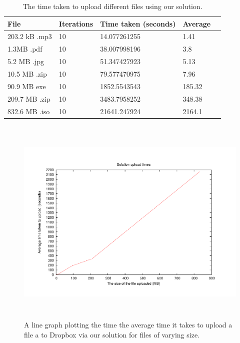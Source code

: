 \documentclass[12pt, titlepage]{article}
\begin{document}
\bigskip
\begin{table}[H]
\begin{center}
    \begin{tabular}{ | l | l | l | l | l |}
    \hline
    \textbf{File} & \textbf{Iterations} & \textbf{Time taken (seconds)} & \textbf{Average} \\ \hline
    203.2 kB .mp3 & 10 & 14.077261255 & 1.41 \\ \hline
    1.3MB .pdf & 10 & 38.007998196 & 3.8 \\ \hline 
    5.2 MB .jpg & 10 & 51.347427923 & 5.13 \\ \hline
    10.5 MB .zip & 10 & 79.577470975 & 7.96  \\ \hline
    90.9 MB exe & 10 & 1852.5543543 & 185.32 \\ \hline
    209.7 MB .zip & 10 & 3483.7958252 & 348.38 \\ \hline
    832.6 MB .iso & 10 & 21641.247924 & 2164.1 \\ \hline
    \end{tabular}
    \caption{The time taken to upload different files using our solution.} \label{tab:uploadBenchmark}
    \end{center}
\end{table}

\begin{figure}[H]
\centerline{\includegraphics[height=4.0in,width=7in,angle=0]{plots/solutionUpload/solutionUploadTimes.pdf}}
\caption{A line graph plotting the time the average time it takes to upload a file a to Dropbox via our solution for files of varying size.}
\label{fig:solutionUploadLineGraph}
\end{figure}
\end{document}
